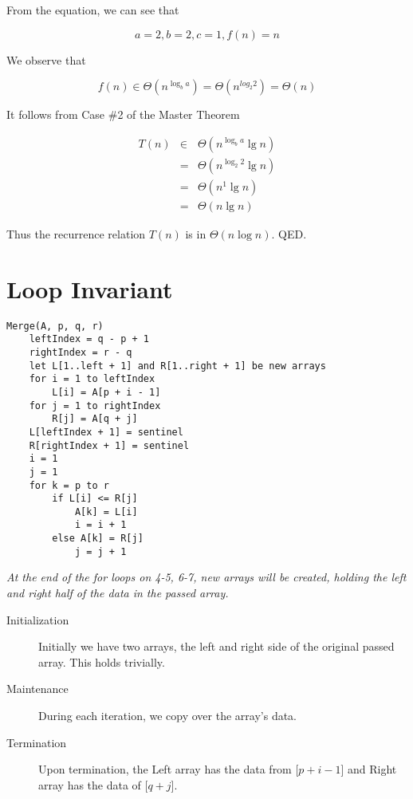 \documentclass{article}
\begin{document}
From the equation, we can see that

\begin{equation}
a = 2, b = 2, c = 1, f(n) = n
\end{equation}

We observe that

\begin{equation}
f(n) \in \Theta(n^{\log _b a}) = \Theta (n ^{log _2 2}) = \Theta(n)
\end{equation}

It follows from Case \#2 of the Master Theorem

\begin{eqnarray}
T(n) & \in & \Theta(n^{\log _b a} \lg n) \\
& = & \Theta (n^{\log _2 2} \lg n) \\
& = & \Theta (n^1 \lg n) \\
& = & \Theta (n \lg n)
\end{eqnarray}

Thus the recurrence relation $T(n)$ is in $\Theta (n \log n)$. QED.

\section{Loop Invariant}
\begin{Verbatim}
Merge(A, p, q, r)
    leftIndex = q - p + 1
    rightIndex = r - q
    let L[1..left + 1] and R[1..right + 1] be new arrays
    for i = 1 to leftIndex
        L[i] = A[p + i - 1]
    for j = 1 to rightIndex
        R[j] = A[q + j]
    L[leftIndex + 1] = sentinel
    R[rightIndex + 1] = sentinel
    i = 1
    j = 1
    for k = p to r
        if L[i] <= R[j]
            A[k] = L[i]
            i = i + 1
        else A[k] = R[j]
            j = j + 1
\end{Verbatim}

\noindent
\textit{At the end of the for loops on 4-5, 6-7, new arrays will be created, holding the left and right half of the data in the passed array.}
\begin{description}
\item [Initialization] Initially we have two arrays, the left and right side of the original passed array. This holds trivially.
\item [Maintenance] During each iteration, we copy over the array's data.
\item [Termination] Upon termination, the Left array has the data from [$p + i - 1$] and Right array has the data of [$q + j$].
\end{description}
\end{document}

